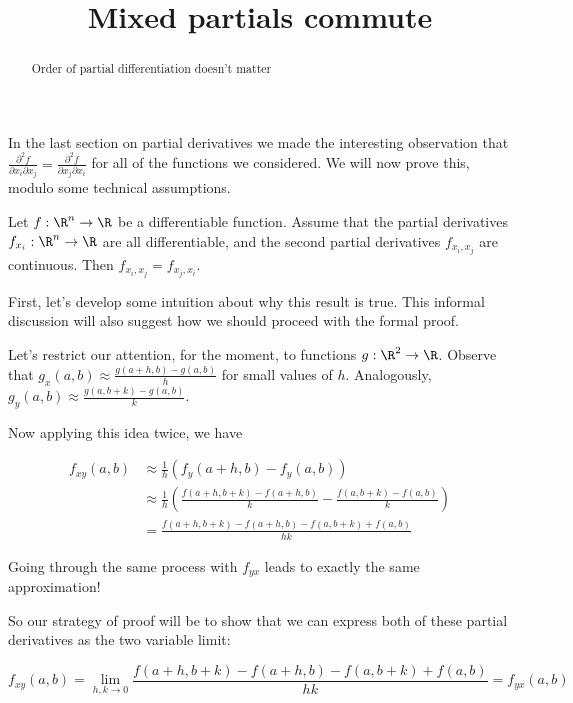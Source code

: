 \documentclass{ximera}
\title{Mixed partials commute}
\begin{document}
	\begin{abstract}
		Order of partial differentiation doesn't matter
	\end{abstract}
	
	In the last section on partial derivatives we made the interesting observation that $\frac{\partial^2 f}{\partial x_i \partial x_j} = \frac{\partial^2 f}{\partial x_j \partial x_i}$
	for all of the functions we considered.  We will now prove this, modulo some technical assumptions.
	
	\begin{theorem}
		Let $f:\R^n \to \R$ be a differentiable function.  Assume that the partial derivatives $f_{x_i}:\R^n \to \R$ are all differentiable, and the second partial derivatives
		$f_{x_i,x_j}$ are continuous.  Then $f_{x_i,x_j} = f_{x_j,x_i}$.
	\end{theorem}
	
	First, let's develop some intuition about why this result is true.  This informal discussion will also suggest how we should proceed with the formal proof.
	
	Let's restrict our attention, for the moment, to functions $g: \R^2 \to \R$.  Observe that  $g_{x}(a,b) \approx \frac{g(a+h,b)-g(a,b)}{h}$ for small values of $h$.  Analogously,
	$g_{y}(a,b) \approx \frac{g(a,b+k)-g(a,b)}{k}$.
	
	Now applying this idea twice, we have 
	
	\begin{align*}
		f_{xy}(a,b) &\approx \frac{1}{h} \left( f_y(a+h,b) - f_y(a,b)\right)\\
			&\approx \frac{1}{h} \left( \frac{f(a+h,b+k)-f(a+h,b)}{k} - \frac{f(a,b+k)-f(a,b)}{k}\right)\\
			&=\frac{f(a+h,b+k)-f(a+h,b)-f(a,b+k)+f(a,b)}{hk}
	\end{align*}
	
	Going through the same process with $f_{yx}$ leads to exactly the same approximation!
	
	So our strategy of proof will be to show that we can express both of these partial derivatives as the two variable limit:
	
	\[
		f_{xy}(a,b) = \displaystyle\lim_{h,k \to 0} \frac{f(a+h,b+k)-f(a+h,b)-f(a,b+k)+f(a,b)}{hk} = f_{yx}(a,b)
	\]
	
\end{document}
